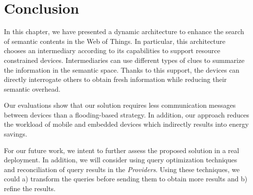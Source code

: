 \section{Conclusion}
\label{conclusion}

In this chapter, we have presented a dynamic architecture to enhance the search of semantic contents in the Web of Things.
In particular, this architecture chooses an intermediary according to its capabilities to support resource constrained devices.
Intermediaries can use different types of clues to summarize the information in the semantic space.
Thanks to this support, the devices can directly interrogate others to obtain fresh information while reducing their semantic overhead.

Our evaluations show that our solution requires less communication messages between devices than a flooding-based strategy.
In addition, our approach reduces the workload of mobile and embedded devices which indirectly results into energy savings.

For our future work, we intent to further assess the proposed solution in a real deployment.
In addition, we will consider using query optimization techniques and reconciliation of query results in the \emph{Providers}.
Using these techniques, we could a) transform the queries before sending them to obtain more results
and b) refine the results.